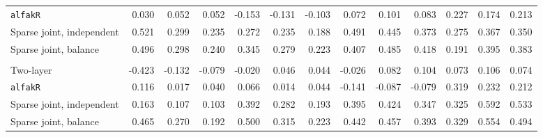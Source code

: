 \begin{center}
\begin{tabular}{l*{12}{r}}
\quad \texttt{alfakR} & 0.030 & 0.052 & 0.052 & -0.153 & -0.131 & -0.103 & 0.072 & 0.101 & 0.083 & 0.227 & 0.174 & 0.213 \\
\quad Sparse joint, independent & 0.521 & 0.299 & 0.235 & 0.272 & 0.235 & 0.188 & 0.491 & 0.445 & 0.373 & 0.275 & 0.367 & 0.350 \\
\quad Sparse joint, balance & 0.496 & 0.298 & 0.240 & 0.345 & 0.279 & 0.223 & 0.407 & 0.485 & 0.418 & 0.191 & 0.395 & 0.383 \\
\addlinespace[2pt]
\multicolumn{13}{l}{\textit{3000/100, 360 d}} \\
\quad Two-layer & -0.423 & -0.132 & -0.079 & -0.020 & 0.046 & 0.044 & -0.026 & 0.082 & 0.104 & 0.073 & 0.106 & 0.074 \\
\quad \texttt{alfakR} & 0.116 & 0.017 & 0.040 & 0.066 & 0.014 & 0.044 & -0.141 & -0.087 & -0.079 & 0.319 & 0.232 & 0.212 \\
\quad Sparse joint, independent & 0.163 & 0.107 & 0.103 & 0.392 & 0.282 & 0.193 & 0.395 & 0.424 & 0.347 & 0.325 & 0.592 & 0.533 \\
\quad Sparse joint, balance & 0.465 & 0.270 & 0.192 & 0.500 & 0.315 & 0.223 & 0.442 & 0.457 & 0.393 & 0.329 & 0.554 & 0.494 \\
\bottomrule
\end{tabular}
\end{center}

